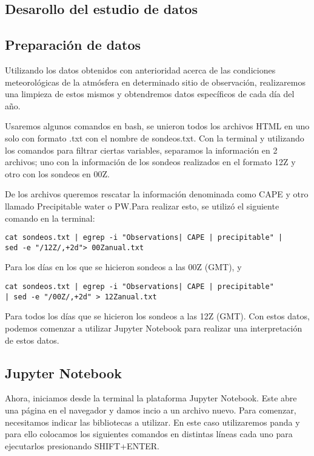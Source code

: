 \documentclass[12pt,letterpaper]{article}
\begin{document}
\begin{portada}
\section{Desarollo del estudio de datos}
\subsection{Preparación de datos}
Utilizando los datos obtenidos con anterioridad acerca de las condiciones meteorológicas de la atmósfera en determinado sitio de observación, realizaremos una limpieza de estos mismos y obtendremos datos específicos de cada día del año.

Usaremos algunos comandos en bash, se unieron todos los archivos HTML en uno solo con formato .txt con el nombre de sondeos.txt. Con la terminal y utilizando los comandos para filtrar ciertas variables, separamos la información en 2 archivos; uno con la información de los sondeos realizados en el formato 12Z y otro con los sondeos en 00Z.

De los archivos queremos rescatar la información denominada como CAPE y otro llamado Precipitable water o PW.Para realizar esto, se utilizó el siguiente comando en la terminal:

\begin{verbatim}
cat sondeos.txt | egrep -i "Observations| CAPE | precipitable" |
sed -e "/12Z/,+2d"> 00Zanual.txt
\end{verbatim}

Para los días en los que se hicieron sondeos a las 00Z (GMT), y

\begin{verbatim}
cat sondeos.txt | egrep -i "Observations| CAPE | precipitable"
| sed -e "/00Z/,+2d" > 12Zanual.txt
\end{verbatim}

Para todos los días que se hicieron los sondeos a las 12Z (GMT).
Con estos datos, podemos comenzar a utilizar Jupyter Notebook para realizar una interpretación de estos datos. 

\subsection{Jupyter Notebook}

Ahora, iniciamos desde la terminal la plataforma Jupyter Notebook. Este abre una página en el navegador y damos incio a un archivo nuevo. Para comenzar, necesitamos indicar las bibliotecas a utilizar. En este caso utilizaremos panda y para ello colocamos los siguientes comandos en distintas líneas cada uno para ejecutarlos presionando SHIFT+ENTER.


\end{portada}
\end{document}
